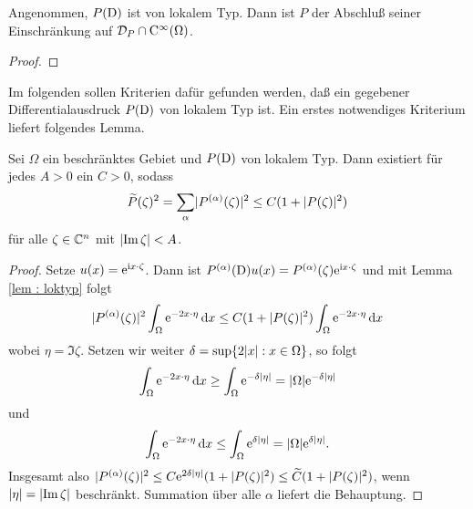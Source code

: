 %
%
%

\begin{thm}
   Angenommen, $P(\mathrm D)$ ist von lokalem Typ. Dann ist $P$ der Abschluß seiner Einschränkung auf $\mathcal D_P\cap \mathrm C^\infty(\Omega)$.
\end{thm}
\begin{proof}
\end{proof}

%
%

Im folgenden sollen Kriterien dafür gefunden werden, daß ein gegebener Differentialausdruck $P(\mathrm D)$ von lokalem Typ ist. Ein erstes notwendiges Kriterium liefert folgendes Lemma.

\begin{lem}
Sei $\Omega$ ein beschränktes Gebiet und $P(\mathrm D)$ von lokalem Typ. Dann existiert für jedes $A>0$ ein $C>0$, sodass
\begin{equation}
\widetilde{P}(\zeta)^2=\sum_\alpha \lvert P^{(\alpha)}(\zeta)\rvert^2\leq C(1+\lvert P(\zeta)\rvert^2)
\end{equation}
für alle $\zeta\in\mathbb C^n$ mit $\lvert\operatorname{Im} \zeta\rvert < A$.
\end{lem}
\begin{proof}
Setze $u(x)=\mathrm e^{\mathrm i x\cdot\zeta}$. Dann ist $P^{(\alpha)}(\mathrm D)u(x)=P^{(\alpha)}(\zeta)\mathrm e^{\mathrm i x\cdot\zeta}$ und mit Lemma \ref{lem : loktyp} folgt
\begin{equation}
\lvert P^{(\alpha)}(\zeta)\rvert^2 \int_{\Omega} \mathrm e^{-2x\cdot \eta}\,\mathrm d x \leq C(1+\lvert P(\zeta)\rvert^2)\int_\Omega \mathrm e^{-2x\cdot \eta}\,\mathrm d x
\end{equation}
wobei $\eta = \Im \zeta$. Setzen wir weiter $\delta = \sup \{2\lvert x\rvert:x\in\Omega\}$, so folgt
\begin{equation}
\int_\Omega \mathrm e^{-2x\cdot \eta}\,\mathrm d x \geq \int_\Omega \mathrm e^{-\delta \lvert\eta\rvert}=\lvert\Omega\rvert\mathrm e^{-\delta \lvert\eta\rvert}
\end{equation}
und
\begin{equation}
\int_\Omega \mathrm e^{-2x\cdot \eta}\,\mathrm d x \leq \int_\Omega \mathrm e^{\delta \lvert\eta\rvert}=\lvert\Omega\rvert\mathrm e^{\delta \lvert\eta\rvert}.
\end{equation}
Insgesamt also $\lvert P^{(\alpha)}(\zeta)\rvert^2\leq C\mathrm e^{2\delta \lvert\eta\rvert}(1+\lvert P(\zeta)\rvert^2)\leq \widetilde{C}(1+\lvert P(\zeta)\rvert^2) $, wenn $\lvert\eta\rvert=\lvert\operatorname{Im} \zeta\rvert$ beschränkt. Summation über alle $\alpha$ liefert die Behauptung.
\end{proof}


%
%

